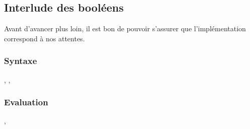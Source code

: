 \documentclass[11pt]{article}
\begin{document}
\subsection{Interlude des booléens}
\label{sec:org317d124}

Avant d'avancer plus loin, il est bon de pouvoir s'assurer que l'implémentation correspond à nos attentes.

\subsubsection{Syntaxe}
\label{sec:org5119189}

\begin{decl}{\te, \tty, \tk}
 \drule{\ttrue}{}
 \drule{\tfalse}{}
\end{decl}

\subsubsection{Evaluation}
\label{sec:org050754c}

\begin{decl}{\ve, \vty}
    \drule{\vtrue}{}
    \drule{\vfalse}{}
    \drule{\vboolty}{}
\end{decl}

\begin{decl}{\vn}
    \drule{\ncond{\ve}{\tv}{\vty}{\ve[2]}{\ve[3]}}{}
\end{decl}


\end{document}
